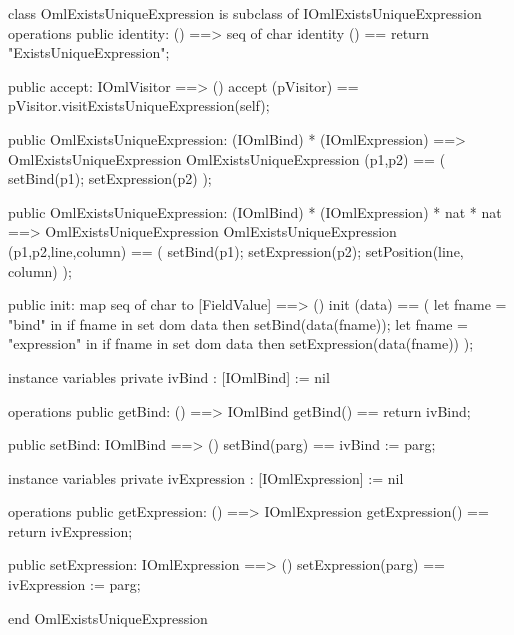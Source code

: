 \begin{vdm_al}
class OmlExistsUniqueExpression is subclass of IOmlExistsUniqueExpression
operations
  public identity: () ==> seq of char
  identity () == return "ExistsUniqueExpression";

  public accept: IOmlVisitor ==> ()
  accept (pVisitor) == pVisitor.visitExistsUniqueExpression(self);

  public OmlExistsUniqueExpression:
    (IOmlBind) *
    (IOmlExpression) ==> OmlExistsUniqueExpression
  OmlExistsUniqueExpression (p1,p2) == 
    ( setBind(p1);
      setExpression(p2) );

  public OmlExistsUniqueExpression:
    (IOmlBind) *
    (IOmlExpression) *
    nat *
    nat ==> OmlExistsUniqueExpression
  OmlExistsUniqueExpression (p1,p2,line,column) == 
    ( setBind(p1);
      setExpression(p2);
      setPosition(line, column) );

  public init: map seq of char to [FieldValue] ==> ()
  init (data) ==
    ( let fname = "bind" in
        if fname in set dom data
        then setBind(data(fname));
      let fname = "expression" in
        if fname in set dom data
        then setExpression(data(fname)) );

instance variables
  private ivBind : [IOmlBind] := nil

operations
  public getBind: () ==> IOmlBind
  getBind() == return ivBind;

  public setBind: IOmlBind ==> ()
  setBind(parg) == ivBind := parg;

instance variables
  private ivExpression : [IOmlExpression] := nil

operations
  public getExpression: () ==> IOmlExpression
  getExpression() == return ivExpression;

  public setExpression: IOmlExpression ==> ()
  setExpression(parg) == ivExpression := parg;

end OmlExistsUniqueExpression
\end{vdm_al}

